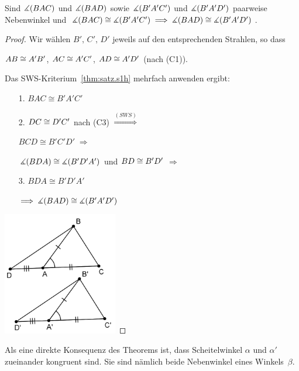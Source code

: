 \begin{thm}\label{thm:satz.s1k}
Sind $\mbox{$\measuredangle$}(BAC)$ und $\mbox{$\measuredangle$}(BAD)$ sowie $\mbox{$\measuredangle$}(B'A'C')$ und $\mbox{$\measuredangle$}(B'A'D')$
paarweise Nebenwinkel und
$\mbox{$\measuredangle$}(BAC)\cong\mbox{$\measuredangle$}(B'A'C')\;\Longrightarrow\;\mbox{$\measuredangle$}(BAD)\cong\mbox{$\measuredangle$}(B'A'D')$.
\end{thm}


\begin{proof}
Wir w\"{a}hlen $B',\,C',\,D'$ jeweils auf den
entsprechenden Strahlen, so dass

${AB}\cong{A'B'}$,
 ${AC}\cong{A'C'}$, ${AD}\cong{A'D'}$ (nach (C1)).

Das SWS-Kriterium~\ref{thm:satz.s1h} mehrfach anwenden ergibt:\\

\begin{enumerate}
    \item[1.] $BAC\cong B'A'C'$
    \item[2.] ${DC}\cong{D'C'}$ nach (C3)
    $\stackrel{(SWS)}{\Longrightarrow}$

    $BCD \cong B'C'D'\;\Longrightarrow$

    $\mbox{$\measuredangle$}(BDA)\cong\mbox{$\measuredangle$}(B'D'A')$
    und ${BD}\cong{B'D'}$
    $\Rightarrow$
    \item[3.] $BDA\cong B'D'A'$

    $\Longrightarrow\;\mbox{$\measuredangle$}(BAD)\cong\mbox{$\measuredangle$}(B'A'D')$

\end{enumerate}


\centerline{\includegraphics[width=5cm]{BILDER/1-2-13-Nebenwinkel.png}}


\end{proof}




Als eine direkte Konsequenz des Theorems ist, dass 
Scheitelwinkel $\alpha$ und $\alpha '$ zueinander
kongruent sind. Sie sind nämlich beide Nebenwinkel eines
Winkels~$\beta$.




